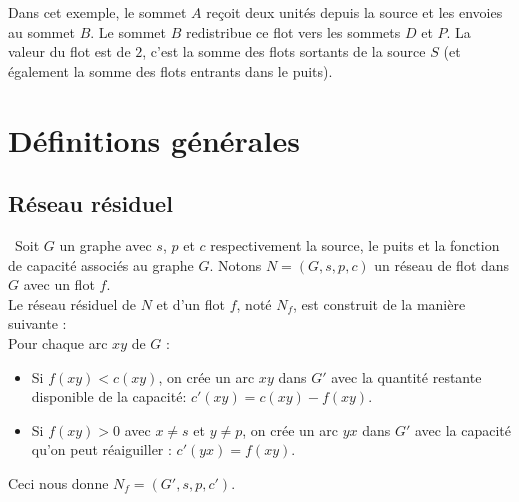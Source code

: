 \documentclass[a4paper]{article}
\begin{document}
Dans cet exemple, le sommet $A$ reçoit deux unités depuis la source et les envoies au sommet $B$. Le sommet $B$ redistribue ce flot vers les sommets $D$ et $P$. La valeur du flot est de $2$, c'est la somme des flots sortants de la source $S$ (et également la somme des flots entrants dans le puits). 

\section{Définitions générales}

\subsection{Réseau résiduel}

\begin{definition}\,
Soit $G$ un graphe avec $s$, $p$ et $c$ respectivement la source, le puits et la fonction de capacité associés au graphe $G$. Notons $N = (G,s,p,c)$ un réseau de flot dans $G$ avec un flot $f$.\\
Le réseau résiduel de $N$ et d'un flot $f$, noté $N_f$, est construit de la manière suivante :\\
Pour chaque arc $xy$ de $G$ :
\begin{itemize}
	\item
    Si $f(xy)<c(xy)$, on crée un arc $xy$ dans $G'$ avec la quantité restante disponible de la capacité: $c'(xy) = c(xy) - f(xy)$.
    \item 
    Si $f(xy)>0$ avec $x\ne s$ et $y\ne p$, on crée un arc $yx$ dans $G'$ avec la capacité qu'on peut réaiguiller : $c'(yx) = f(xy)$.
\end{itemize}
Ceci nous donne $N_f = (G',s,p,c')$.
\end{definition}
\end{document}

